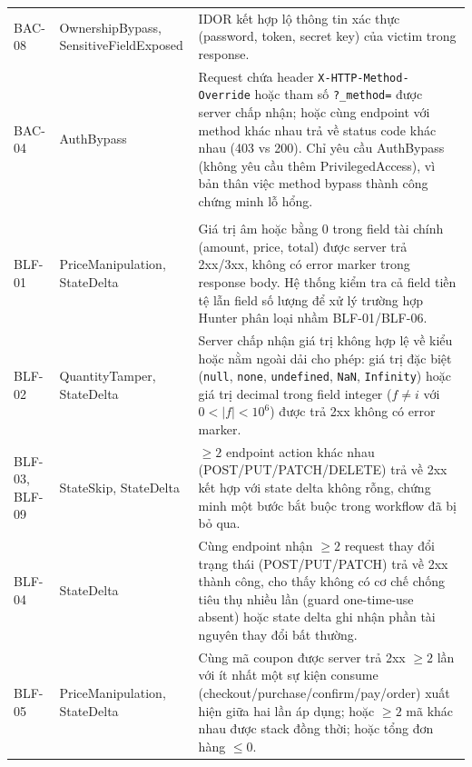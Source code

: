 \begin{longtable}{
  >{\raggedright\arraybackslash}p{2.8cm}
  >{\raggedright\arraybackslash}p{3.2cm}
  >{\raggedright\arraybackslash}p{8.8cm}
}
BAC-08 &
  OwnershipBypass, SensitiveFieldExposed &
  IDOR kết hợp lộ thông tin xác thực (password, token, secret key) của victim trong response. \\[4pt]

BAC-04 &
  AuthBypass &
  Request chứa header \texttt{X-HTTP-Method-Override} hoặc tham số \texttt{?\_method=} được server chấp nhận; hoặc cùng endpoint với method khác nhau trả về status code khác nhau (403 vs 200). Chỉ yêu cầu AuthBypass (không yêu cầu thêm PrivilegedAccess), vì bản thân việc method bypass thành công chứng minh lỗ hổng. \\[4pt]

\midrule
\multicolumn{3}{l}{\textbf{Nhóm BLF (Business Logic Flaw) --- BLFProofGate}} \\
\midrule

BLF-01 &
  PriceManipulation, StateDelta &
  Giá trị âm hoặc bằng 0 trong field tài chính (amount, price, total) được server trả 2xx/3xx, không có error marker trong response body. Hệ thống kiểm tra cả field tiền tệ lẫn field số lượng để xử lý trường hợp Hunter phân loại nhầm BLF-01/BLF-06. \\[4pt]

BLF-02 &
  QuantityTamper, StateDelta &
  Server chấp nhận giá trị không hợp lệ về kiểu hoặc nằm ngoài dải cho phép: giá trị đặc biệt (\texttt{null}, \texttt{none}, \texttt{undefined}, \texttt{NaN}, \texttt{Infinity}) hoặc giá trị decimal trong field integer ($f \neq i$ với $0 < |f| < 10^6$) được trả 2xx không có error marker. \\[4pt]

BLF-03, BLF-09 &
  StateSkip, StateDelta &
  $\geq 2$ endpoint action khác nhau (POST/PUT/PATCH/DELETE) trả về 2xx kết hợp với state delta không rỗng, chứng minh một bước bắt buộc trong workflow đã bị bỏ qua. \\[4pt]

BLF-04 &
  StateDelta &
  Cùng endpoint nhận $\geq 2$ request thay đổi trạng thái (POST/PUT/PATCH) trả về 2xx thành công, cho thấy không có cơ chế chống tiêu thụ nhiều lần (guard one-time-use absent) hoặc state delta ghi nhận phần tài nguyên thay đổi bất thường. \\[4pt]

BLF-05 &
  PriceManipulation, StateDelta &
  Cùng mã coupon được server trả 2xx $\geq 2$ lần với ít nhất một sự kiện consume (checkout/purchase/confirm/pay/order) xuất hiện giữa hai lần áp dụng; hoặc $\geq 2$ mã khác nhau được stack đồng thời; hoặc tổng đơn hàng $\leq 0$. \\[4pt]


\end{longtable}

